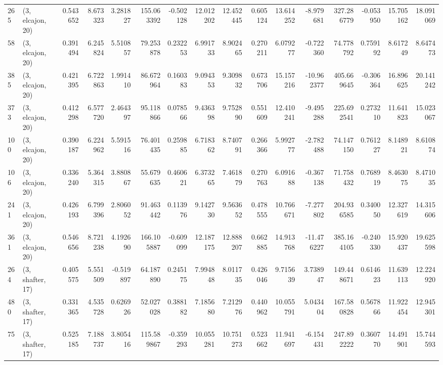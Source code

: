 \begin{tabular}{llrrrrrrrrrrrrrr}
265 &  (3, elcajon, 20) &   0.543652 &   8.673323 &   3.281827 &   155.063392 &  -0.502128 &  12.012202 &  12.452445 &  0.605124 &  13.614252 &  -8.979681 &   327.286779 & -0.053950 &  15.705162 &  18.091069 \\
58  &  (3, elcajon, 20) &   0.391494 &   6.245824 &   5.510857 &    79.253878 &   0.232253 &   6.991733 &   8.902465 &  0.270211 &   6.079277 &  -0.722360 &    74.778792 &  0.759192 &   8.617249 &   8.647473 \\
385 &  (3, elcajon, 20) &   0.421395 &   6.722863 &   1.991410 &    86.672964 &   0.160383 &   9.094353 &   9.309832 &  0.673706 &  15.157216 & -10.962377 &   405.669645 & -0.306364 &  16.896625 &  20.141242 \\
373 &  (3, elcajon, 20) &   0.412298 &   6.577720 &   2.464397 &    95.118866 &   0.078566 &   9.436398 &   9.752890 &  0.551609 &  12.410241 &  -9.495288 &   225.692541 &  0.273210 &  11.641823 &  15.023067 \\
100 &  (3, elcajon, 20) &   0.390187 &   6.224962 &   5.591516 &    76.401435 &   0.259885 &   6.718362 &   8.740791 &  0.266366 &   5.992777 &  -2.782488 &    74.147150 &  0.761227 &   8.148921 &   8.610874 \\
106 &  (3, elcajon, 20) &   0.336240 &   5.364315 &   3.880867 &    55.679635 &   0.460621 &   6.373265 &   7.461879 &  0.270763 &   6.091688 &  -0.367138 &    71.758432 &  0.768919 &   8.463075 &   8.471035 \\
241 &  (3, elcajon, 20) &   0.426193 &   6.799396 &   2.806052 &    91.463442 &   0.113976 &   9.142730 &   9.563652 &  0.478555 &  10.766671 &  -7.277802 &   204.936585 &  0.340050 &  12.327619 &  14.315606 \\
361 &  (3, elcajon, 20) &   0.546656 &   8.721238 &   4.192690 &   166.105887 &  -0.609099 &  12.187175 &  12.888207 &  0.662885 &  14.913768 & -11.476227 &   385.164105 & -0.240330 &  15.920437 &  19.625598 \\
264 &  (3, shafter, 17) &   0.405575 &   5.551509 &  -0.519897 &    64.187890 &   0.245175 &   7.994848 &   8.011735 &  0.426046 &   9.715639 &   3.738947 &   149.448671 &  0.614623 &  11.639113 &  12.224920 \\
480 &  (3, shafter, 17) &   0.331365 &   4.535728 &   0.626926 &    52.027028 &   0.388182 &   7.185680 &   7.212976 &  0.440962 &  10.055791 &   5.043404 &   167.580828 &  0.567866 &  11.922454 &  12.945301 \\
75  &  (3, shafter, 17) &   0.525185 &   7.188737 &   3.805416 &   115.589867 &  -0.359293 &  10.055281 &  10.751273 &  0.523662 &  11.941697 &  -6.154431 &   247.892222 &  0.360770 &  14.491901 &  15.744593 \\

\end{tabular}
